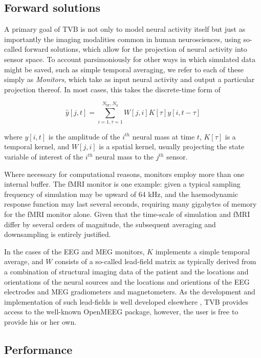 \subsection{Forward solutions}

    A primary goal of TVB is not only to model neural activity itself
    but just as importantly the imaging modalities common in human 
    neurosciences, using so-called forward solutions, which allow for
    the projection of neural activity into sensor space. To account
    parsimoniously for other ways in which simulated data might be saved, 
    such as simple temporal averaging, we refer to each of these simply as 
    \textit{Monitors}, which take as input neural activity and 
    output a particular projection thereof. In most cases, this 
    takes the discrete-time form of

    \[ \hat{y}[j, t] = \sum_{i=1, \tau=1}^{N_W, N_k} W[j, i] K[\tau] y[i, t-\tau] \]

    \noindent where $y[i, t]$ is the amplitude of the $i^{th}$ neural mass at time
    $t$, $K[\tau]$ is a temporal kernel, and $W[j, i]$ is a spatial kernel,
    usually projecting the state variable of interest of the $i^{th}$ 
    neural mass to the $j^{th}$ sensor. 

    Where necessary for computational reasons, monitors employ more than 
    one internal buffer. The fMRI monitor is one 
    example: given a typical sampling frequency of simulation may be upward of 
    64 kHz, and the haemodynamic response function may last several seconds, 
    requiring many gigabytes of memory for the fMRI monitor alone. Given that 
    the time-scale of simulation and fMRI differ by several orders of magnitude, 
    the subsequent averaging and downsampling is entirely justified. 

    In the cases of the EEG and MEG monitors, $K$ implements a simple
    temporal average, and $W$ consists of a so-called lead-field matrix as typically
    derived from a combination of structural imaging data of the patient 
    and the locations and orientations of the neural sources and the locations
    and orientions of the EEG electrodes and MEG gradiometers and magnetometers. 
    As the development and implementation of such lead-fields is well developed
    elsewhere \cite{Jirsa_2002,Nolte2003,Gramfort_2010}, TVB provides access
    to the well-known OpenMEEG package, however, the user is free to provide 
    his or her own.

\subsection{Performance}

